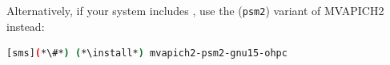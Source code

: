 Alternatively, if your system includes \IntelR{} \OmniPath{}, use the (\texttt{psm2})
variant of MVAPICH2 instead:

\begin{lstlisting}[language=bash]
[sms](*\#*) (*\install*) mvapich2-psm2-gnu15-ohpc
\end{lstlisting}

